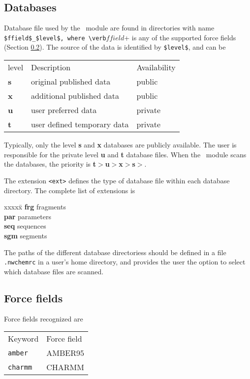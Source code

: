 \subsection{Databases}
Database file used by the \prepare\ module are found in directories with name
\verb+$ffield$_$level$, where \verb+$ffield$+ is any of the
supported force fields (Section \ref{sec:nwaforcefields}). 
The source of the data is identified by \verb+$level$+, and can be 
\begin{center}
\begin{tabular}{lll}
\hline
level   & Description                 & Availability \\
{\bf s} & original published data     & public       \\
{\bf x} & additional published data   & public       \\
{\bf u} & user preferred data         & private      \\
{\bf t} & user defined temporary data & private    \\
\hline
\end{tabular}
\end{center}

Typically, only the level {\bf s} and {\bf x} databases are publicly 
available. 
The user is responsible for the private level {\bf u} and {\bf t}
database files. When the \prepare\ module scans the databases, the priority
is {\bf t}$>${\bf u}$>${\bf x}$>${\bf s}$>$.

The extension \verb+<ext>+ defines the type of database file within each
database directory. The complete list of extensions is
\begin{tabbing}
xxxxx\=\kill
{\bf frg} \> fragments\\
{\bf par} \> parameters\\
{\bf seq} \> sequences\\
{\bf sgm} \> segments\\
\end{tabbing} 

The paths of the different database directoriess should be defined in a file 
{\tt .nwchemrc} in a user's home directory, and provides the user the
option to select which database files are scanned.

\subsection{Force fields}
\label{sec:nwaforcefields}
Force fields recognized are
\begin{center}
\begin{tabular}{ll}
\hline
Keyword      & Force field   \\
{\tt amber}  & AMBER95       \\
{\tt charmm} & CHARMM        \\
\hline
\end{tabular}
\end{center}  

